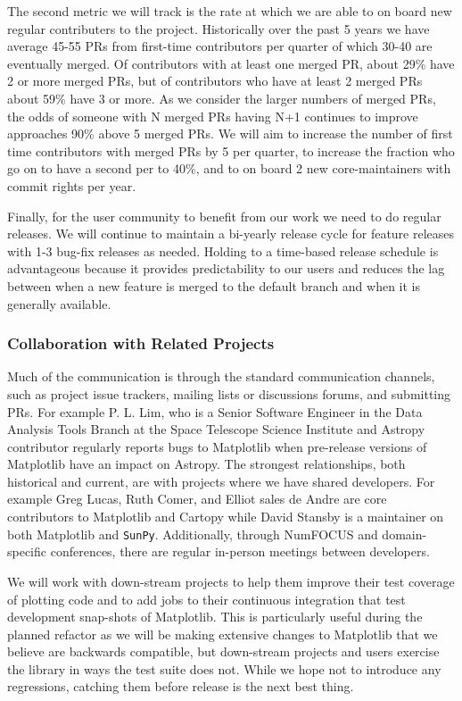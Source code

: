 \documentclass[12pt]{article}
\numberwithin{page}{section}
\begin{document}
The second metric we will track is the rate at which we are able to on board
new regular contributers to the project.  Historically over the past 5 years we
have average 45-55 PRs from first-time contributors per quarter of which 30-40
are eventually merged.  Of contributors with at least one merged PR, about 29\%
have 2 or more merged PRs, but of contributors who have at least 2 merged PRs
about 59\% have 3 or more.  As we consider the larger numbers of merged PRs,
the odds of someone with N merged PRs having N+1 continues to improve
approaches 90\% above 5 merged PRs.  We will aim to increase the number of
first time contributors with merged PRs by 5 per quarter, to increase the
fraction who go on to have a second per to 40\%, and to on board 2 new
core-maintainers with commit rights per year.

Finally, for the user community to benefit from our work we need to do
regular releases.  We will continue to maintain a bi-yearly release
cycle for feature releases with 1-3 bug-fix releases as needed.
Holding to a time-based release schedule is advantageous because it
provides predictability to our users and reduces the lag between when a
new feature is merged to the default branch and when it is generally
available.


\subsubsection{Collaboration with Related Projects}


Much of the communication is through the standard communication channels, such
as project issue trackers, mailing lists or discussions forums, and submitting
PRs.  For example P. L. Lim, who is a Senior Software Engineer in the Data
Analysis Tools Branch at the Space Telescope Science Institute and Astropy
contributor regularly reports bugs to Matplotlib when pre-release versions of
Matplotlib have an impact on Astropy.  The strongest relationships, both
historical and current, are with projects where we have shared developers.  For
example Greg Lucas, Ruth Comer, and Elliot sales de Andre are core contributors
to Matplotlib and Cartopy while David Stansby is a maintainer on both
Matplotlib and \texttt{SunPy}.  Additionally, through NumFOCUS and
domain-specific conferences, there are regular in-person meetings between
developers.

We will work with down-stream projects to help them improve their test
coverage of plotting code and to add jobs to their continuous
integration that test development snap-shots of Matplotlib.  This is
particularly useful during the planned refactor as we will be making
extensive changes to Matplotlib that we believe are backwards
compatible, but down-stream projects and users exercise the library in
ways the test suite does not.  While we hope not to introduce any
regressions, catching them before release is the next best thing.
\end{document}
